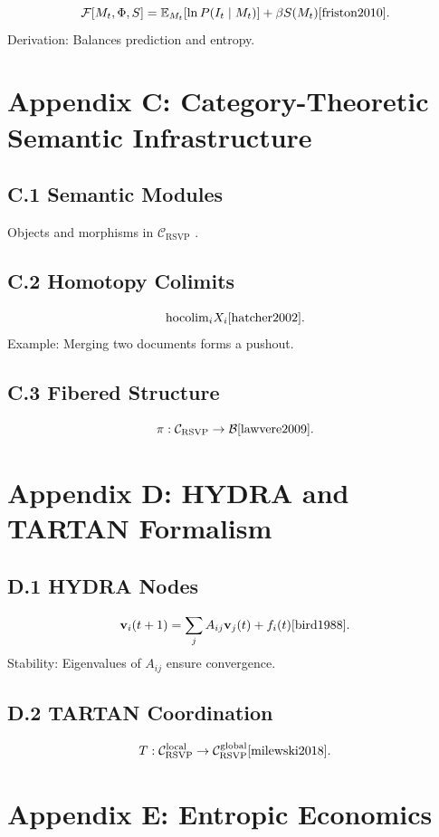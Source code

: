 \documentclass[12pt]{article}
\begin{document}
{{{{{{{{{{{{{{{{{\[
\mathcal{F}[M_t, \Phi, S] = \mathbb{E}_{M_t}[\ln P(I_t \mid M_t)] + \beta S(M_t) \cite{friston2010}.
\]
Derivation: Balances prediction and entropy.

\section{Appendix C: Category-Theoretic Semantic Infrastructure}

\subsection{C.1 Semantic Modules}

Objects and morphisms in \(\mathcal{C}_{\text{RSVP}}\) \cite{maclane1998}.

\subsection{C.2 Homotopy Colimits}

\[
\text{hocolim}_i X_i \cite{hatcher2002}.
\]
Example: Merging two documents forms a pushout.

\subsection{C.3 Fibered Structure}

\[
\pi: \mathcal{C}_{\text{RSVP}} \to \mathcal{B} \cite{lawvere2009}.
\]

\section{Appendix D: HYDRA and TARTAN Formalism}

\subsection{D.1 HYDRA Nodes}

\[
\mathbf{v}_i(t+1) = \sum_j A_{ij} \mathbf{v}_j(t) + f_i(t) \cite{bird1988}.
\]
Stability: Eigenvalues of \(A_{ij}\) ensure convergence.

\subsection{D.2 TARTAN Coordination}

\[
T: \mathcal{C}_{\text{RSVP}}^{\text{local}} \to \mathcal{C}_{\text{RSVP}}^{\text{global}} \cite{milewski2018}.
\]

\section{Appendix E: Entropic Economics}

}}}}}}}}}}}}}}}}}
\end{document}
